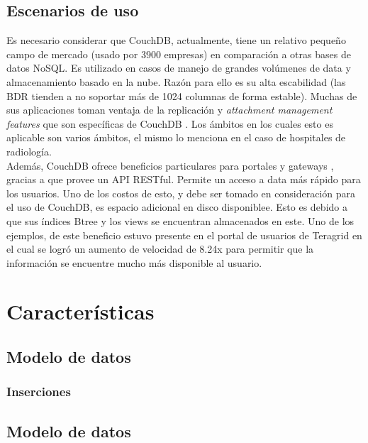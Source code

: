 \documentclass{article}
\begin{document}
        \subsection{Escenarios de uso}
            Es necesario considerar que CouchDB, actualmente, tiene un relativo pequeño campo de mercado (usado por 3900 empresas) en comparación a otras bases de datos NoSQL. Es utilizado en casos de manejo de grandes volúmenes de data y almacenamiento basado en la nube. Razón para ello es su alta escabilidad (las BDR tienden a no soportar más de 1024 columnas de forma estable). Muchas de sus aplicaciones toman ventaja de la replicación y \textit{attachment management features} que son específicas de CouchDB \cite{rascovsky}. Los ámbitos en los cuales esto es aplicable son varios ámbitos, el mismo \cite{rascovsky} lo menciona en el caso de hospitales de radiología.\\
            Además, CouchDB ofrece beneficios particulares para portales y gateways \cite{hanlon}, gracias a que provee un API RESTful. Permite un acceso a data más rápido para los usuarios. Uno de los costos de esto, y debe ser tomado en consideración para el uso de CouchDB, es espacio adicional en disco disponiblee. Esto es debido a que sus índices Btree y los views se encuentran almacenados en este. Uno de los ejemplos, de este beneficio estuvo presente en el portal de usuarios de Teragrid en el cual se logró un aumento de velocidad de 8.24x \cite{hanlon} para permitir que la información se encuentre mucho más disponible al usuario.
    \section{Características}
        \subsection{Modelo de datos}
            \subsubsection{Inserciones}
            \subsection{Modelo de datos}
\end{document}
